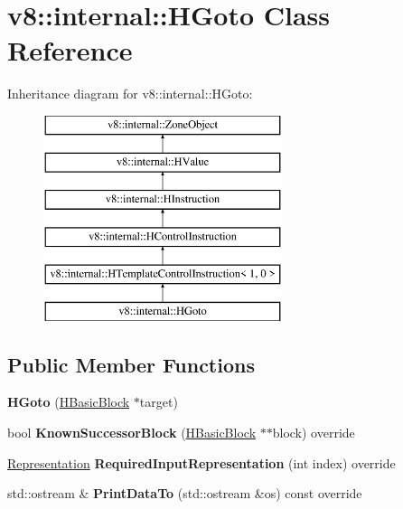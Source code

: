 \hypertarget{classv8_1_1internal_1_1_h_goto}{}\section{v8\+:\+:internal\+:\+:H\+Goto Class Reference}
\label{classv8_1_1internal_1_1_h_goto}
Inheritance diagram for v8\+:\+:internal\+:\+:H\+Goto\+:\begin{figure}[H]
\begin{center}
\leavevmode
\includegraphics[height=6.000000cm]{classv8_1_1internal_1_1_h_goto}
\end{center}
\end{figure}
\subsection*{Public Member Functions}
\begin{DoxyCompactItemize}
\item 
{\bfseries H\+Goto} (\hyperlink{classv8_1_1internal_1_1_h_basic_block}{H\+Basic\+Block} $\ast$target)\hypertarget{classv8_1_1internal_1_1_h_goto_a38889811eb04e0b4948e5bc5d494d996}{}\label{classv8_1_1internal_1_1_h_goto_a38889811eb04e0b4948e5bc5d494d996}

\item 
bool {\bfseries Known\+Successor\+Block} (\hyperlink{classv8_1_1internal_1_1_h_basic_block}{H\+Basic\+Block} $\ast$$\ast$block) override\hypertarget{classv8_1_1internal_1_1_h_goto_a75141846f1e26885a013d369a7a6e8c6}{}\label{classv8_1_1internal_1_1_h_goto_a75141846f1e26885a013d369a7a6e8c6}

\item 
\hyperlink{classv8_1_1internal_1_1_representation}{Representation} {\bfseries Required\+Input\+Representation} (int index) override\hypertarget{classv8_1_1internal_1_1_h_goto_a9082e3aa143501dc904fccf8633de99d}{}\label{classv8_1_1internal_1_1_h_goto_a9082e3aa143501dc904fccf8633de99d}

\item 
std\+::ostream \& {\bfseries Print\+Data\+To} (std\+::ostream \&os) const  override\hypertarget{classv8_1_1internal_1_1_h_goto_a75464d9fa99affef0e763e7119cd6df8}{}\label{classv8_1_1internal_1_1_h_goto_a75464d9fa99affef0e763e7119cd6df8}

\end{DoxyCompactItemize}
